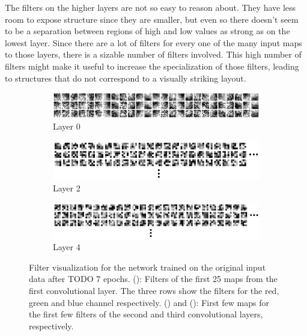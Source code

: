 \documentclass[11pt, a4paper]{article}
\begin{document}
The filters on the higher layers are not so easy to reason about. They have less room to expose structure since they are smaller, but even so there doesn't seem to be a separation between regions of high and low values as strong as on the lowest layer. Since there are a lot of filters for every one of the many input maps to those layers, there is a sizable number of filters involved. This high number of filters might make it useful to increase the specialization of those filters, leading to structures that do not correspond to a visually striking layout. %

\begin{figure}
	\centering
	\begin{subfigure}{\textwidth}
		\includegraphics[width=1\textwidth]{filter_visualizations/gtsrb_nomorph_filters_0}
		\caption{Layer 0}
		\label{fig:gtsrb-filters-0}
	\end{subfigure}
	\begin{subfigure}{\textwidth}
		\includegraphics[width=1\textwidth]{filter_visualizations/gtsrb_nomorph_filters_2}
		\caption{Layer 2}
		\label{fig:gtsrb-filters-2}
	\end{subfigure}
	\begin{subfigure}{\textwidth}
		\includegraphics[width=1\textwidth]{filter_visualizations/gtsrb_nomorph_filters_4}
		\caption{Layer 4}
		\label{fig:gtsrb-filters-4}
	\end{subfigure}
	\caption{Filter visualization for the network trained on the original input data after TODO 7 epochs. (): Filters of the first 25 maps from the first convolutional layer. The three rows show the filters for the red, green and blue channel respectively. () and (): First few maps for the first few filters of the second and third convolutional layers, respectively.}
	\label{fig:gtsrb-filters}
\end{figure}
\end{document}
